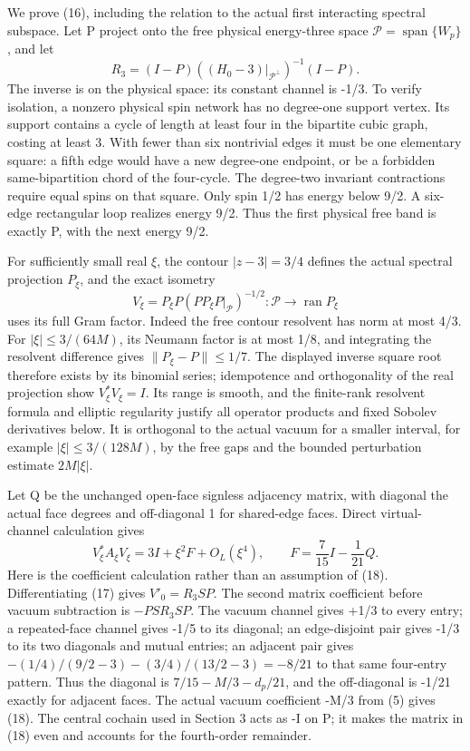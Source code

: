 \documentclass[
  11pt,
]{article}
\begin{document}
We prove (16), including the relation to the actual first interacting
spectral subspace. Let P project onto the free physical energy-three
space \(\mathcal P=\operatorname{span}\{W_p\}\), and let \[
 R_3=(I-P)((H_0-3)|_{\mathcal P^\perp})^{-1}(I-P).
\] The inverse is on the physical space: its constant channel is -1/3.
To verify isolation, a nonzero physical spin network has no degree-one
support vertex. Its support contains a cycle of length at least four in
the bipartite cubic graph, costing at least 3. With fewer than six
nontrivial edges it must be one elementary square: a fifth edge would
have a new degree-one endpoint, or be a forbidden same-bipartition chord
of the four-cycle. The degree-two invariant contractions require equal
spins on that square. Only spin 1/2 has energy below 9/2. A six-edge
rectangular loop realizes energy 9/2. Thus the first physical free band
is exactly P, with the next energy 9/2.

For sufficiently small real \(\xi\), the contour \(|z-3|=3/4\) defines
the actual spectral projection \(P_\xi\), and the exact isometry \[
 V_\xi=P_\xi P(PP_\xi P|_{\mathcal P})^{-1/2}
       :\mathcal P\longrightarrow\operatorname{ran}P_\xi
\tag{17}
\] uses its full Gram factor. Indeed the free contour resolvent has norm
at most 4/3. For \(|\xi|\le3/(64M)\), its Neumann factor is at most 1/8,
and integrating the resolvent difference gives \(\|P_\xi-P\|\le1/7\).
The displayed inverse square root therefore exists by its binomial
series; idempotence and orthogonality of the real projection show
\(V_\xi^*V_\xi=I\). Its range is smooth, and the finite-rank resolvent
formula and elliptic regularity justify all operator products and fixed
Sobolev derivatives below. It is orthogonal to the actual vacuum for a
smaller interval, for example \(|\xi|\le3/(128M)\), by the free gaps and
the bounded perturbation estimate \(2M|\xi|\).

Let Q be the unchanged open-face signless adjacency matrix, with
diagonal the actual face degrees and off-diagonal 1 for shared-edge
faces. Direct virtual-channel calculation gives \[
 V_\xi^*A_\xi V_\xi=3I+\xi^2F+O_L(\xi^4),\qquad
 F=\frac7{15}I-\frac1{21}Q.
\tag{18}
\] Here is the coefficient calculation rather than an assumption of
(18). Differentiating (17) gives \(V'_0=R_3SP\). The second matrix
coefficient before vacuum subtraction is \(-PSR_3SP\). The vacuum
channel gives +1/3 to every entry; a repeated-face channel gives -1/5 to
its diagonal; an edge-disjoint pair gives -1/3 to its two diagonals and
mutual entries; an adjacent pair gives
\(- (1/4)/(9/2-3)-(3/4)/(13/2-3)=-8/21\) to that same four-entry
pattern. Thus the diagonal is \(7/15-M/3-d_p/21\), and the off-diagonal
is -1/21 exactly for adjacent faces. The actual vacuum coefficient -M/3
from (5) gives (18). The central cochain used in Section 3 acts as -I on
P; it makes the matrix in (18) even and accounts for the fourth-order
remainder.
\end{document}
